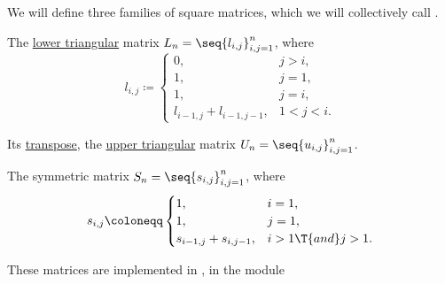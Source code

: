 \begin{definition}\label{def:pascal_matrix}
  We will define three families of square matrices, which we will collectively call .
  \begin{thmenum}
     The \hyperref[def:triangular_matrix]{lower triangular} matrix \( L_n = \seq{ l_{i,j} }_{i,j=1}^n \), where
    \begin{equation*}
      l_{i,j} \coloneqq \begin{cases}
        0,                       &j > i, \\
        1,                       &j = 1, \\
        1,                       &j = i, \\
        l_{i-1,j} + l_{i-1,j-1}, &1 < j < i.
      \end{cases}
    \end{equation*}

     Its \hyperref[def:transpose_matrix]{transpose}, the \hyperref[def:triangular_matrix]{upper triangular} matrix \( U_n = \seq{ u_{i,j} }_{i,j=1}^n \).

     The symmetric matrix \( S_n = \seq{ s_{i,j} }_{i,j=1}^n \), where
    \begin{equation*}
      s_{i,j} \coloneqq \begin{cases}
        1,                     &i = 1, \\
        1,                     &j = 1, \\
        s_{i-1,j} + s_{i,j-1}, &i > 1 \T{and} j > 1.
      \end{cases}
    \end{equation*}
  \end{thmenum}
\end{definition}
\begin{comments}
  \item These matrices are implemented in \cite{notebook:code}, in the module
  \begin{CodeRefDisplay}
  \end{CodeRefDisplay}
\end{comments}

